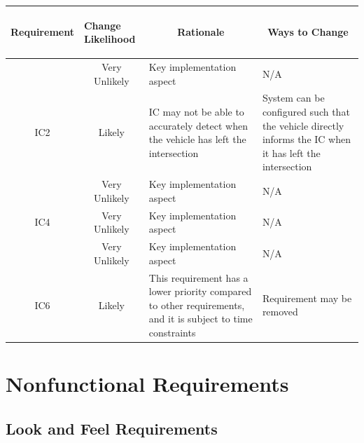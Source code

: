 \documentclass [11pt]{article}
\begin{document}
\begin{longtable}{| p{ } | p{ } |  p{ } | p{ } |}\hline 
\multicolumn{1}{|c|}{\textbf {Requirement}} & 
\begin{minipage}{.14 \columnwidth}\begin{center}\vspace{1.5mm}\textbf{Change Likelihood}   \vspace{1.5mm} \end{center}\end{minipage}& 
\multicolumn{1}{c|}{\textbf {Rationale}} & \multicolumn{1}{c|}{\textbf {Ways to Change}} \\ \hline

\rowcolor{tableCell} \multicolumn{1}{|c|}{IC1}& \multicolumn{1}{|c|}{Very Unlikely}& Key implementation aspect & N/A \\ \hline
\multicolumn{1}{|c|}{IC2}&\multicolumn{1}{|c|}{Likely} & IC may not be able to accurately detect when the vehicle has left the intersection & System can be configured such that the vehicle directly informs the IC when it has left the intersection \\ \hline
\rowcolor{tableCell} \multicolumn{1}{|c|}{IC3}&\multicolumn{1}{|c|}{Very Unlikely} & Key implementation aspect & N/A \\ \hline
\multicolumn{1}{|c|}{IC4}&\multicolumn{1}{|c|}{Very Unlikely} & Key implementation aspect & N/A \\ \hline
\rowcolor{tableCell} \multicolumn{1}{|c|}{IC5}&\multicolumn{1}{|c|}{Very Unlikely} & Key implementation aspect & N/A \\ \hline
\multicolumn{1}{|c|}{IC6}&\multicolumn{1}{|c|}{Likely} & This requirement has a lower priority compared to other requirements, and it is subject to time constraints & Requirement may be removed \\ \hline


\end{longtable}





\section {Nonfunctional Requirements} 



\subsection {Look and Feel Requirements}
\end{document}
